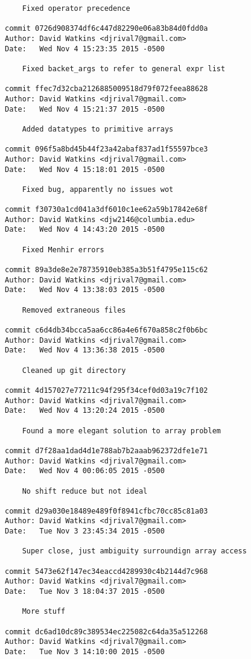 \begin{verbatim}
    Fixed operator precedence

commit 0726d908374df6c447d82290e06a83b84d0fdd0a
Author: David Watkins <djrival7@gmail.com>
Date:   Wed Nov 4 15:23:35 2015 -0500

    Fixed backet_args to refer to general expr list

commit ffec7d32cba2126885009518d79f072feea88628
Author: David Watkins <djrival7@gmail.com>
Date:   Wed Nov 4 15:21:37 2015 -0500

    Added datatypes to primitive arrays

commit 096f5a8bd45b44f23a42abaf837ad1f55597bce3
Author: David Watkins <djrival7@gmail.com>
Date:   Wed Nov 4 15:18:01 2015 -0500

    Fixed bug, apparently no issues wot

commit f30730a1cd041a3df6010c1ee62a59b17842e68f
Author: David Watkins <djw2146@columbia.edu>
Date:   Wed Nov 4 14:43:20 2015 -0500

    Fixed Menhir errors

commit 89a3de8e2e78735910eb385a3b51f4795e115c62
Author: David Watkins <djrival7@gmail.com>
Date:   Wed Nov 4 13:38:03 2015 -0500

    Removed extraneous files

commit c6d4db34bcca5aa6cc86a4e6f670a858c2f0b6bc
Author: David Watkins <djrival7@gmail.com>
Date:   Wed Nov 4 13:36:38 2015 -0500

    Cleaned up git directory

commit 4d157027e77211c94f295f34cef0d03a19c7f102
Author: David Watkins <djrival7@gmail.com>
Date:   Wed Nov 4 13:20:24 2015 -0500

    Found a more elegant solution to array problem

commit d7f28aa1dad4d1e788ab7b2aaab962372dfe1e71
Author: David Watkins <djrival7@gmail.com>
Date:   Wed Nov 4 00:06:05 2015 -0500

    No shift reduce but not ideal

commit d29a030e18489e489f0f8941cfbc70cc85c81a03
Author: David Watkins <djrival7@gmail.com>
Date:   Tue Nov 3 23:45:34 2015 -0500

    Super close, just ambiguity surroundign array access

commit 5473e62f147ec34eaccd4289930c4b2144d7c968
Author: David Watkins <djrival7@gmail.com>
Date:   Tue Nov 3 18:04:37 2015 -0500

    More stuff

commit dc6ad10dc89c389534ec225082c64da35a512268
Author: David Watkins <djrival7@gmail.com>
Date:   Tue Nov 3 14:10:00 2015 -0500


\end{verbatim}
